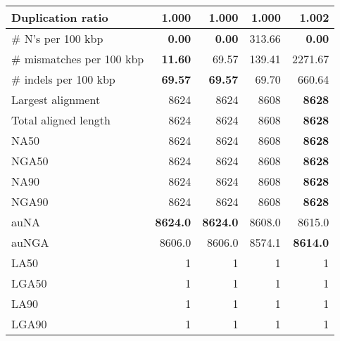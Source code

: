 \documentclass[12pt,a4paper]{article}
\begin{document}
\begin{table}[ht]
\begin{center}
\begin{tabular}{|l*{4}{|r}|}
Duplication ratio & {\bf 1.000} & {\bf 1.000} & {\bf 1.000} & 1.002 \\ \hline
\# N's per 100 kbp & {\bf 0.00} & {\bf 0.00} & 313.66 & {\bf 0.00} \\ \hline
\# mismatches per 100 kbp & {\bf 11.60} & 69.57 & 139.41 & 2271.67 \\ \hline
\# indels per 100 kbp & {\bf 69.57} & {\bf 69.57} & 69.70 & 660.64 \\ \hline
Largest alignment & 8624 & 8624 & 8608 & {\bf 8628} \\ \hline
Total aligned length & 8624 & 8624 & 8608 & {\bf 8628} \\ \hline
NA50 & 8624 & 8624 & 8608 & {\bf 8628} \\ \hline
NGA50 & 8624 & 8624 & 8608 & {\bf 8628} \\ \hline
NA90 & 8624 & 8624 & 8608 & {\bf 8628} \\ \hline
NGA90 & 8624 & 8624 & 8608 & {\bf 8628} \\ \hline
auNA & {\bf 8624.0} & {\bf 8624.0} & 8608.0 & 8615.0 \\ \hline
auNGA & 8606.0 & 8606.0 & 8574.1 & {\bf 8614.0} \\ \hline
LA50 & 1 & 1 & 1 & 1 \\ \hline
LGA50 & 1 & 1 & 1 & 1 \\ \hline
LA90 & 1 & 1 & 1 & 1 \\ \hline
LGA90 & 1 & 1 & 1 & 1 \\ \hline
\end{tabular}
\end{center}
\end{table}
\end{document}
